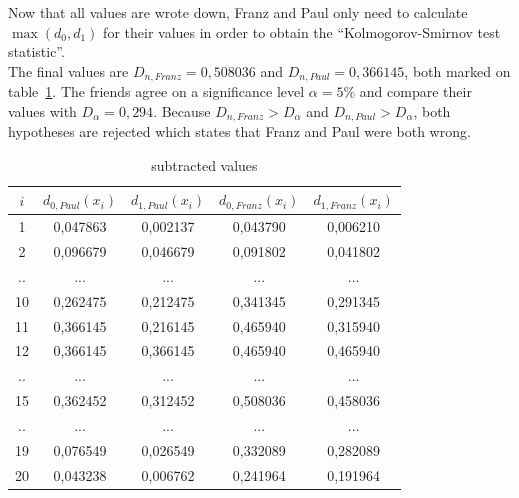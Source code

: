 \documentclass{article}
\begin{document}
Now that all values are wrote down, Franz and Paul only need to calculate $\max(d_0,d_1)$ for their values in order to obtain the ``Kolmogorov-Smirnov test statistic''.\\
The final values are $D_{n,Franz}=0,508036$ and $D_{n,Paul}=0,366145$, both marked on table~\ref{tab:2}.
The friends agree on a significance level $\alpha = 5\%$ and compare their values with $D_\alpha=0,294$. Because $D_{n,Franz}>D_\alpha$ and $D_{n,Paul}>D_\alpha$, both hypotheses are rejected which states that Franz and Paul were both wrong.
\begin{table}[ht]
\caption{subtracted values}
\center
\begin{tabular}{c|c|c|c|c}
\label{tab:2}
$i$ 	& $d_{0,Paul}(x_i)$ 	& $d_{1,Paul}(x_i)$ 	& $d_{0,Franz}(x_i)$ 	& $d_{1,Franz}(x_i)$ 	\\
\hline
1	&	0,047863	&	0,002137	&	0,043790	&	0,006210	\\
2	&	0,096679	&	0,046679	&	0,091802	&	0,041802	\\
..	&	...		&	...		&	...		&	...		\\
10	&	0,262475	&	0,212475	&	0,341345	&	0,291345	\\
11	&	0,366145	&	0,216145	&	0,465940	&	0,315940	\\
12	&\cellcolor[gray]{0.9}	0,366145	&	0,366145	&	0,465940	&	0,465940	\\
..	&	...		&	...		&	...		&	...		\\
15	&	0,362452	&	0,312452	&\cellcolor[gray]{0.9}	0,508036	&	0,458036	\\
..	&	...		&	...		&	...		&	...		\\
19	&	0,076549	&	0,026549	&	0,332089	&	0,282089	\\
20	&	0,043238	&	0,006762	&	0,241964	&	0,191964	\\
\end{tabular}
\end{table}
\end{document}
